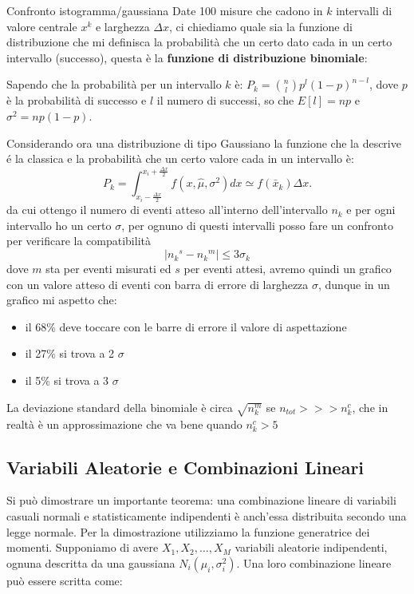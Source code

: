 \documentclass[openany,a4paper,12pt]{book}
\theoremstyle{remark}
\begin{document}
\begin{bressan}{Confronto istogramma/gaussiana}
Date 100 misure che cadono in $k$ intervalli di valore centrale $x^k$ e larghezza $\Delta x$, ci chiediamo quale sia la funzione di distribuzione che mi definisca la probabilità che un certo dato cada in un
certo intervallo (successo), questa è la \textbf{funzione di distribuzione binomiale}:

Sapendo che la probabilità per un intervallo $k$ è: $P_k= \binom{n}{l}p^l(1-p)^{n-l}$, dove $p$ è la probabilità di successo e $l$ il numero di successi, so che $E[l]=np$ e  $\sigma^2= np(1-p)$.

Considerando ora una distribuzione di tipo Gaussiano la funzione che la descrive é la classica e la probabilità che un certo valore cada in un intervallo è:
\[
P_k=\int_{x_i -\frac{\Delta x}{2}}^{x_i + \frac{\Delta x}{2}} f(x, \hat{\mu}, \sigma^2) dx \simeq f(\bar{x}_k) \Delta x. 
\]
da cui ottengo il numero di eventi atteso all'interno dell'intervallo $n_k$ e per ogni intervallo ho un certo $\sigma$, per ognuno di questi intervalli posso fare un confronto per verificare la compatibilità
\begin{equation*}
\left| {n_k}^s-{n_k}^m \right| \leq 3 \sigma_k
\end{equation*}
dove $m$ sta per eventi misurati ed $s$ per eventi attesi, avremo quindi un grafico con un valore atteso di eventi con barra di errore di larghezza $\sigma$, dunque in un grafico mi aspetto che:
\begin{itemize}
\item il 68\% deve toccare con le barre di errore il valore di aspettazione
\item il 27\% si trova a 2 $\sigma$
\item il 5\% si trova a 3 $\sigma$
\end{itemize}
La deviazione standard della binomiale è circa $\sqrt{n_k^m}$ se $n_{tot}>>>n_k^c$, che in realtà è un approssimazione che va bene quando $n_k^c > 5$
\end{bressan}
\subsection*{Variabili Aleatorie e Combinazioni Lineari}

Si può dimostrare un importante teorema: una combinazione lineare di variabili casuali normali e statisticamente indipendenti è anch'essa distribuita secondo una legge normale.
Per la dimostrazione utilizziamo la funzione generatrice dei momenti. Supponiamo di avere $X_1, X_2, \dots, X_M$ variabili aleatorie indipendenti, ognuna descritta da una gaussiana $N_i(\mu_i, \sigma_i^2)$. Una loro combinazione lineare può essere scritta come:
\end{document}
